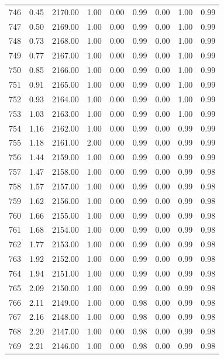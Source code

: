 \documentclass{article}\usepackage[]{graphicx}\usepackage[]{color}
\begin{document}
\begin{longtable}{rrrrrrrrr}
  746 & 0.45 & 2170.00 & 1.00 & 0.00 & 0.99 & 0.00 & 1.00 & 0.99 \\ 
  747 & 0.50 & 2169.00 & 1.00 & 0.00 & 0.99 & 0.00 & 1.00 & 0.99 \\ 
  748 & 0.73 & 2168.00 & 1.00 & 0.00 & 0.99 & 0.00 & 1.00 & 0.99 \\ 
  749 & 0.77 & 2167.00 & 1.00 & 0.00 & 0.99 & 0.00 & 1.00 & 0.99 \\ 
  750 & 0.85 & 2166.00 & 1.00 & 0.00 & 0.99 & 0.00 & 1.00 & 0.99 \\ 
  751 & 0.91 & 2165.00 & 1.00 & 0.00 & 0.99 & 0.00 & 1.00 & 0.99 \\ 
  752 & 0.93 & 2164.00 & 1.00 & 0.00 & 0.99 & 0.00 & 1.00 & 0.99 \\ 
  753 & 1.03 & 2163.00 & 1.00 & 0.00 & 0.99 & 0.00 & 1.00 & 0.99 \\ 
  754 & 1.16 & 2162.00 & 1.00 & 0.00 & 0.99 & 0.00 & 0.99 & 0.99 \\ 
  755 & 1.18 & 2161.00 & 2.00 & 0.00 & 0.99 & 0.00 & 0.99 & 0.99 \\ 
  756 & 1.44 & 2159.00 & 1.00 & 0.00 & 0.99 & 0.00 & 0.99 & 0.99 \\ 
  757 & 1.47 & 2158.00 & 1.00 & 0.00 & 0.99 & 0.00 & 0.99 & 0.98 \\ 
  758 & 1.57 & 2157.00 & 1.00 & 0.00 & 0.99 & 0.00 & 0.99 & 0.98 \\ 
  759 & 1.62 & 2156.00 & 1.00 & 0.00 & 0.99 & 0.00 & 0.99 & 0.98 \\ 
  760 & 1.66 & 2155.00 & 1.00 & 0.00 & 0.99 & 0.00 & 0.99 & 0.98 \\ 
  761 & 1.68 & 2154.00 & 1.00 & 0.00 & 0.99 & 0.00 & 0.99 & 0.98 \\ 
  762 & 1.77 & 2153.00 & 1.00 & 0.00 & 0.99 & 0.00 & 0.99 & 0.98 \\ 
  763 & 1.92 & 2152.00 & 1.00 & 0.00 & 0.99 & 0.00 & 0.99 & 0.98 \\ 
  764 & 1.94 & 2151.00 & 1.00 & 0.00 & 0.99 & 0.00 & 0.99 & 0.98 \\ 
  765 & 2.09 & 2150.00 & 1.00 & 0.00 & 0.99 & 0.00 & 0.99 & 0.98 \\ 
  766 & 2.11 & 2149.00 & 1.00 & 0.00 & 0.98 & 0.00 & 0.99 & 0.98 \\ 
  767 & 2.16 & 2148.00 & 1.00 & 0.00 & 0.98 & 0.00 & 0.99 & 0.98 \\ 
  768 & 2.20 & 2147.00 & 1.00 & 0.00 & 0.98 & 0.00 & 0.99 & 0.98 \\ 
  769 & 2.21 & 2146.00 & 1.00 & 0.00 & 0.98 & 0.00 & 0.99 & 0.98 \\ 

\end{longtable}
\end{document}
